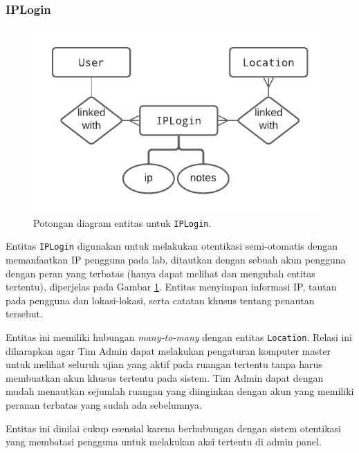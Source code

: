 \subsubsection{IPLogin}
    \begin{figure}
        \centering
        \includegraphics{Gambar/erd-details/ERD--New - IPLogin.pdf}
        \caption{Potongan diagram entitas untuk \texttt{IPLogin}.}
        \label{fig:erd_iplogin}
    \end{figure}
    Entitas \texttt{IPLogin} digunakan untuk melakukan otentikasi semi-otomatis
    dengan memanfaatkan IP pengguna pada lab, ditautkan dengan sebuah akun
    pengguna dengan peran yang terbatas (hanya dapat melihat dan mengubah
    entitas tertentu), diperjelas pada Gambar \ref{fig:erd_iplogin}. Entitas
    menyimpan informasi IP, tautan pada pengguna dan lokasi-lokasi, serta
    catatan khusus tentang penautan tersebut. 
    
    Entitas ini memiliki hubungan \textit{many-to-many} dengan entitas
    \texttt{Location}. Relasi ini diharapkan agar Tim Admin dapat melakukan
    pengaturan komputer master untuk melihat seluruh ujian yang aktif pada
    ruangan tertentu tanpa harus membuatkan akun khusus tertentu pada sistem.
    Tim Admin dapat dengan mudah menautkan sejumlah ruangan yang diinginkan
    dengan akun yang memiliki peranan terbatas yang sudah ada sebelumnya.
    
    Entitas ini dinilai cukup esensial karena berhubungan dengan sistem
    otentikasi yang membatasi pengguna untuk melakukan aksi tertentu di admin
    panel.
    
